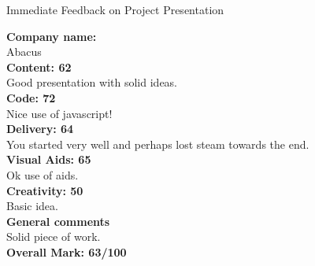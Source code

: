 \documentclass{article}
\begin{document}
\begin{center}
\Huge{Immediate Feedback on Project Presentation}\\
\end{center}


\normalsize
\textbf{Company name:}\\

Abacus \\

\textbf{Content: 62}\\

Good presentation with solid ideas.\\

\textbf{Code: 72}\\

Nice use of javascript!\\

\textbf{Delivery: 64}\\

You started very well and perhaps lost steam towards the end.\\

\textbf{Visual Aids: 65}\\

Ok use of aids.\\

\textbf{Creativity: 50}\\

Basic idea.\\

\textbf{General comments}\\

Solid piece of work.\\

\textbf{Overall Mark: 63/100}
\end{document}
